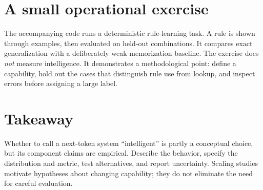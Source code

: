 \documentclass[11pt]{article}
\begin{document}
\section{A small operational exercise}
The accompanying code runs a deterministic rule-learning task. A rule is shown through examples, then evaluated on held-out combinations. It compares exact generalization with a deliberately weak memorization baseline. The exercise does \emph{not} measure intelligence. It demonstrates a methodological point: define a capability, hold out the cases that distinguish rule use from lookup, and inspect errors before assigning a large label.

\section{Takeaway}
Whether to call a next-token system ``intelligent'' is partly a conceptual choice, but its component claims are empirical. Describe the behavior, specify the distribution and metric, test alternatives, and report uncertainty. Scaling studies motivate hypotheses about changing capability; they do not eliminate the need for careful evaluation.


\end{document}
